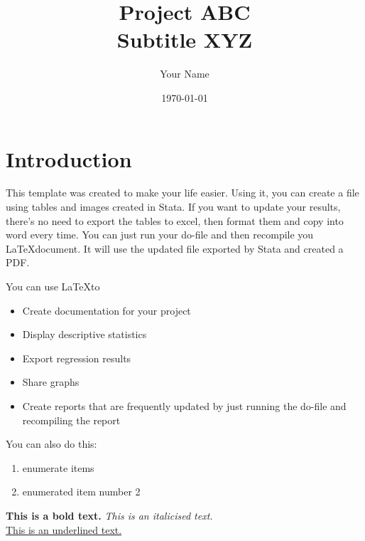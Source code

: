 \documentclass{article}
\title{Project ABC \\ Subtitle XYZ} 	%
\author{Your Name}
\date{\today}
\begin{document}
\maketitle
\tableofcontents

\newpage
\listoffigures
\listoftables

\newpage
\section{Introduction} %

This template was created to make your life easier. Using it, you can create a file using tables and images created in Stata. If you want to update your results, there's no need to export the tables to excel, then format them and copy into word every time. You can just run your do-file and then recompile you \LaTeX document. It will use the updated file exported by Stata and created a PDF.

You can use \LaTeX to
\begin{itemize} %
	\item Create documentation for your project
	\item Display descriptive statistics
	\item Export regression results
	\item Share graphs
	\item Create reports that are frequently updated by just running the do-file and recompiling the report
\end{itemize}

You can also do this:
\begin{enumerate}
	\item enumerate items
	\item enumerated item number 2
\end{enumerate}

\textbf{This is a bold text.} \newline  \textit{This is an italicised text.} \\
\underline{This is an underlined text.}

\end{document}
